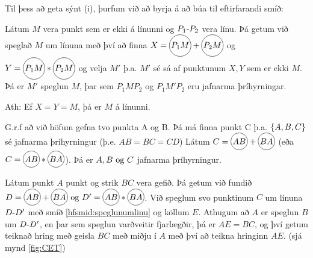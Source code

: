 \begin{frame}
  Til þess að geta sýnt (i), þurfum við að byrja á að búa til eftirfarandi
  smíð:
\begin{hfsmid}
\label{hfsmid:speglunumlinu}
  Látum \(M\) vera punkt sem er ekki á línunni og \( \lin{P_1}{P_2} \)
  vera línu. Þá getum við speglað \(M\) um línuna með því að finna
  \(X = \hri{P_1M} + \hri{P_2M}\) og
  \(Y = \hri{P_1M} * \hri{P_2M} \) og velja \(M'\) þ.a. \(M'\) sé sá af punktunum
  \(X, Y\) sem er ekki \(M\).  Þá er \(M'\) speglun \(M\),
  þar sem \(P_1MP_2\) og \(P_1M'P_2\) eru jafnarma þríhyrningar.

  Ath: Ef \(X = Y = M\), þá er \(M\) á línunni.
  \end{hfsmid}
\end{frame}

\begin{frame}
  \begin{hfsmid} \label{hfsmid:jafnarmathri}
    G.r.f að við höfum gefna tvo punkta A og B. Þá má finna punkt C
    þ.a. \(\set{A,B,C}\) sé jafnarma þríhyrningur (þ.e. \(AB = BC =CD\))
    Látum \(C = \hri{AB}+\hri{BA}\) (eða \(C = \hri{AB}*\hri{BA}\)). Þá er \(A,B \Og C\) jafnarma þríhyrningur.
  \end{hfsmid}
\end{frame}


\begin{frame}
  \begin{hfsmid} \label{hfsmid:faerslalengdar}
    Látum  punkt \(A\)  punkt og strik  \(BC\) vera gefið.
    Þá getum við fundið \(D = \hri{AB} + \hri{BA} \Og D' = \hri{AB}*\hri{BA}\).
    Við speglum svo punktinum \(C\) um línuna \(\lin{D}{D'}\) með
    smíð \ref{hfsmid:speglunumlinu} og köllum \(E\). Athugum að
    \(A\) er speglun \(B\) um \(\lin{D}{D'}\), en þar sem speglun varðveitir
    fjarlægðir, þá er \(AE = BC\), og því getum teiknað hring með
    geisla \(BC\) með miðju í \(A\) með því að teikna hringinn \(AE\).
   (sjá mynd \ref{fig:CET}) 
  \end{hfsmid}
\end{frame}

